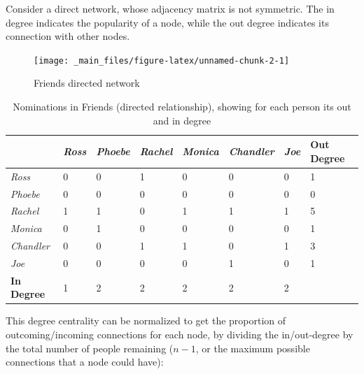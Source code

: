 \documentclass[
  notitlepage,
  onecolumn,
  openany]{book}
\begin{document}
Consider a direct network, whose adjacency matrix is not symmetric. The in degree indicates the popularity of a node, while the out degree indicates its connection with other nodes.

\begin{figure}
\texttt{[image: \_main\_files/figure-latex/unnamed-chunk-2-1]} \caption{Friends directed network}\label{fig:unnamed-chunk-2}
\end{figure}

\begin{table}[h]
\centering
\begin{tabular}{@{}llllllll@{}}
\toprule
                   & \textit{Ross} & \textit{Phoebe} & \textit{Rachel} & \textit{Monica} & \textit{Chandler} & \textit{Joe} & \textbf{Out Degree} \\ \midrule
\textit{Ross}      & 0             & 0               & 1               & 0               & 0                 & 0            & 1                   \\
\textit{Phoebe}    & 0             & 0               & 0               & 0               & 0                 & 0            & 0                   \\
\textit{Rachel}    & 1             & 1               & 0               & 1               & 1                 & 1            & 5                   \\
\textit{Monica}    & 0             & 1               & 0               & 0               & 0                 & 0            & 1                   \\
\textit{Chandler}  & 0             & 0               & 1               & 1               & 0                 & 1            & 3                   \\
\textit{Joe}       & 0             & 0               & 0               & 0               & 1                 & 0            & 1                   \\
\textbf{In Degree} & 1             & 2               & 2               & 2               & 2                 & 2            &                     \\ \bottomrule
\end{tabular}
\caption{Nominations in Friends (directed relationship), showing for each person its out and in degree}
\label{tab:dir_degree}
\end{table}

This degree centrality can be normalized to get the proportion of outcoming/incoming connections for each node, by dividing the in/out-degree by the total number of people remaining (\(n-1\), or the maximum possible connections that a node could have):
\end{document}
